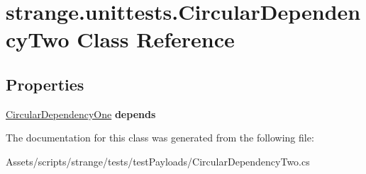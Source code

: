 \hypertarget{classstrange_1_1unittests_1_1_circular_dependency_two}{\section{strange.\-unittests.\-Circular\-Dependency\-Two Class Reference}
\label{classstrange_1_1unittests_1_1_circular_dependency_two}
}
\subsection*{Properties}
\begin{DoxyCompactItemize}
\item 
\hypertarget{classstrange_1_1unittests_1_1_circular_dependency_two_af7174fd28e87418689048dabbff89c55}{\hyperlink{classstrange_1_1unittests_1_1_circular_dependency_one}{Circular\-Dependency\-One} {\bfseries depends}}\label{classstrange_1_1unittests_1_1_circular_dependency_two_af7174fd28e87418689048dabbff89c55}

\end{DoxyCompactItemize}


The documentation for this class was generated from the following file\-:\begin{DoxyCompactItemize}
\item 
Assets/scripts/strange/tests/test\-Payloads/Circular\-Dependency\-Two.\-cs\end{DoxyCompactItemize}

